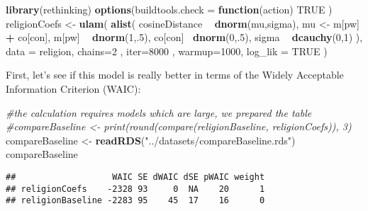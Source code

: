 \documentclass[]{book}
\newenvironment{Shaded}{\begin{snugshade}}{\end{snugshade}}
\newcommand{\KeywordTok}[1]{\textcolor[rgb]{0.13,0.29,0.53}{\textbf{#1}}}
\newcommand{\DataTypeTok}[1]{\textcolor[rgb]{0.13,0.29,0.53}{#1}}
\newcommand{\DecValTok}[1]{\textcolor[rgb]{0.00,0.00,0.81}{#1}}
\newcommand{\StringTok}[1]{\textcolor[rgb]{0.31,0.60,0.02}{#1}}
\newcommand{\CommentTok}[1]{\textcolor[rgb]{0.56,0.35,0.01}{\textit{#1}}}
\newcommand{\OtherTok}[1]{\textcolor[rgb]{0.56,0.35,0.01}{#1}}
\newcommand{\ControlFlowTok}[1]{\textcolor[rgb]{0.13,0.29,0.53}{\textbf{#1}}}
\newcommand{\OperatorTok}[1]{\textcolor[rgb]{0.81,0.36,0.00}{\textbf{#1}}}
\newcommand{\NormalTok}[1]{#1}
\begin{document}
\vspace{1mm} \footnotesize

\begin{Shaded}
\begin{Highlighting}[]
\KeywordTok{library}\NormalTok{(rethinking)}
\KeywordTok{options}\NormalTok{(}\DataTypeTok{buildtools.check =} \ControlFlowTok{function}\NormalTok{(action) }\OtherTok{TRUE}\NormalTok{ )}
\NormalTok{religionCoefs <-}\StringTok{ }\KeywordTok{ulam}\NormalTok{(}
  \KeywordTok{alist}\NormalTok{(}
\NormalTok{    cosineDistance }\OperatorTok{~}\StringTok{ }\KeywordTok{dnorm}\NormalTok{(mu,sigma),}
\NormalTok{    mu <-}\StringTok{ }\NormalTok{m[pw] }\OperatorTok{+}\StringTok{ }\NormalTok{co[con],}
\NormalTok{    m[pw] }\OperatorTok{~}\StringTok{ }\KeywordTok{dnorm}\NormalTok{(}\DecValTok{1}\NormalTok{,.}\DecValTok{5}\NormalTok{),}
\NormalTok{    co[con] }\OperatorTok{~}\KeywordTok{dnorm}\NormalTok{(}\DecValTok{0}\NormalTok{,.}\DecValTok{5}\NormalTok{),}
\NormalTok{    sigma }\OperatorTok{~}\StringTok{ }\KeywordTok{dcauchy}\NormalTok{(}\DecValTok{0}\NormalTok{,}\DecValTok{1}\NormalTok{)}
\NormalTok{  ),}
  \DataTypeTok{data =}\NormalTok{ religion,}
  \DataTypeTok{chains=}\DecValTok{2}\NormalTok{ , }\DataTypeTok{iter=}\DecValTok{8000}\NormalTok{ , }\DataTypeTok{warmup=}\DecValTok{1000}\NormalTok{, }
  \DataTypeTok{log_lik =} \OtherTok{TRUE}
\NormalTok{)}
\end{Highlighting}
\end{Shaded}

\normalsize

\noindent First, let's see if this model is really better in terms of
the Widely Acceptable Information Criterion (WAIC):

\vspace{1mm} \footnotesize

\begin{Shaded}
\begin{Highlighting}[]
\CommentTok{#the calculation requires models which are large, we prepared the table}
\CommentTok{#compareBaseline <- print(round(compare(religionBaseline, religionCoefs)), 3)}
\NormalTok{compareBaseline <-}\StringTok{ }\KeywordTok{readRDS}\NormalTok{(}\StringTok{"../datasets/compareBaseline.rds"}\NormalTok{)}
\NormalTok{compareBaseline}
\end{Highlighting}
\end{Shaded}

\begin{verbatim}
##                   WAIC SE dWAIC dSE pWAIC weight
## religionCoefs    -2328 93     0  NA    20      1
## religionBaseline -2283 95    45  17    16      0
\end{verbatim}

\normalsize
\end{document}
